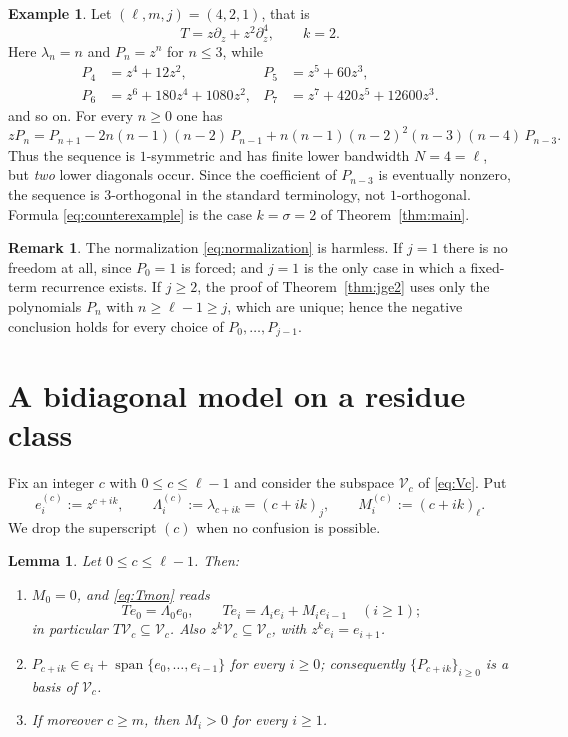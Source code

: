\documentclass{amsart}
\newtheorem{lemma}[theorem]{Lemma}
\theoremstyle{definition}
\newtheorem{example}[theorem]{Example}
\newtheorem{remark}[theorem]{Remark}
\DeclareMathOperator{\spn}{span}
\newcommand{\fall}[2]{(#1)_{#2}}
\begin{document}
\begin{example}\label{ex:counterexample}
Let \((\ell,m,j)=(4,2,1)\), that is
\[
T=z\partial_z+z^2\partial_z^4,
\qquad k=2 .
\]
Here \(\lambda_n=n\) and \(P_n=z^n\) for \(n\le3\), while
\begin{align*}
P_4&=z^4+12z^2, & P_5&=z^5+60z^3,\\
P_6&=z^6+180z^4+1080z^2,
& P_7&=z^7+420z^5+12600z^3.
\end{align*}
and so on.  For every \(n\ge0\) one has
\begin{equation}\label{eq:counterexample}
zP_n
=
P_{n+1}
-2n(n-1)(n-2)\,P_{n-1}
+n(n-1)(n-2)^2(n-3)(n-4)\,P_{n-3} .
\end{equation}
Thus the sequence is \(1\)-symmetric and has finite lower bandwidth
\(N=4=\ell\), but \emph{two} lower diagonals occur.  Since the coefficient of
\(P_{n-3}\) is eventually nonzero, the sequence is \(3\)-orthogonal in the
standard terminology, not \(1\)-orthogonal.  Formula
\eqref{eq:counterexample} is the case \(k=\sigma=2\) of
Theorem~\ref{thm:main}.
\end{example}

\begin{remark}\label{rem:normalization}
The normalization \eqref{eq:normalization} is harmless.  If \(j=1\) there is
no freedom at all, since \(P_0=1\) is forced; and \(j=1\) is the only case in
which a fixed-term recurrence exists.  If \(j\ge2\), the proof of
Theorem~\ref{thm:jge2} uses only the polynomials \(P_n\) with
\(n\ge\ell-1\ge j\), which are unique; hence the negative conclusion holds
for every choice of \(P_0,\dots,P_{j-1}\).
\end{remark}

\section{A bidiagonal model on a residue class}\label{sec:bidiag}

Fix an integer \(c\) with \(0\le c\le\ell-1\) and consider the subspace
\(\mathcal V_c\) of \eqref{eq:Vc}.  Put
\[
e^{(c)}_i:=z^{c+ik},
\qquad
\Lambda^{(c)}_i:=\lambda_{c+ik}=\fall{c+ik}{j},
\qquad
M^{(c)}_i:=\fall{c+ik}{\ell}.
\]
We drop the superscript \((c)\) when no confusion is possible.

\begin{lemma}\label{lem:basis}
Let \(0\le c\le\ell-1\).  Then:
\begin{enumerate}
\item \(M_0=0\), and \eqref{eq:Tmon} reads
\begin{equation}\label{eq:bidiagonal}
Te_0=\Lambda_0e_0,
\qquad
Te_i=\Lambda_ie_i+M_ie_{i-1}\quad(i\ge1);
\end{equation}
in particular \(T\mathcal V_c\subseteq\mathcal V_c\).  Also
\(z^k\mathcal V_c\subseteq\mathcal V_c\), with \(z^k e_i=e_{i+1}\).
\item \(P_{c+ik}\in e_i+\spn\{e_0,\dots,e_{i-1}\}\) for every \(i\ge0\);
consequently \(\{P_{c+ik}\}_{i\ge0}\) is a basis of \(\mathcal V_c\).
\item If moreover \(c\ge m\), then \(M_i>0\) for every \(i\ge1\).
\end{enumerate}
\end{lemma}
\end{document}
